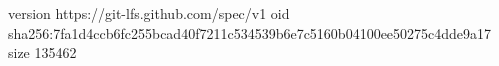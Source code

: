 version https://git-lfs.github.com/spec/v1
oid sha256:7fa1d4ccb6fc255bcad40f7211c534539b6e7c5160b04100ee50275c4dde9a17
size 135462
